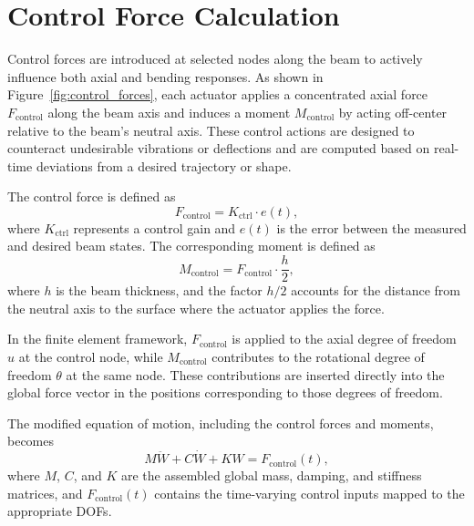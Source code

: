 \documentclass{article}
\begin{document}
	
	
	
	
	
	
	
	
	
	\section*{Control Force Calculation}
	Control forces are introduced at selected nodes along the beam to actively influence both axial and bending responses. As shown in Figure~\ref{fig:control_forces}, each actuator applies a concentrated axial force \( F_{\text{control}} \) along the beam axis and induces a moment \( M_{\text{control}} \) by acting off-center relative to the beam’s neutral axis. These control actions are designed to counteract undesirable vibrations or deflections and are computed based on real-time deviations from a desired trajectory or shape.
	
	The control force is defined as
	\begin{equation}
		F_{\text{control}} = K_{\text{ctrl}} \cdot e(t),
	\end{equation}
	where \( K_{\text{ctrl}} \) represents a control gain and \( e(t) \) is the error between the measured and desired beam states. The corresponding moment is defined as
	\begin{equation}
		M_{\text{control}} = F_{\text{control}} \cdot \frac{h}{2},
	\end{equation}
	where \( h \) is the beam thickness, and the factor \( h/2 \) accounts for the distance from the neutral axis to the surface where the actuator applies the force.
	
	In the finite element framework, \( F_{\text{control}} \) is applied to the axial degree of freedom \( u \) at the control node, while \( M_{\text{control}} \) contributes to the rotational degree of freedom \( \theta \) at the same node. These contributions are inserted directly into the global force vector in the positions corresponding to those degrees of freedom.
	
	The modified equation of motion, including the control forces and moments, becomes
	\begin{equation}
		M \ddot{W} + C \dot{W} + K W = F_{\text{control}}(t),
	\end{equation}
	where \( M \), \( C \), and \( K \) are the assembled global mass, damping, and stiffness matrices, and \( F_{\text{control}}(t) \) contains the time-varying control inputs mapped to the appropriate DOFs.
	
\end{document}
